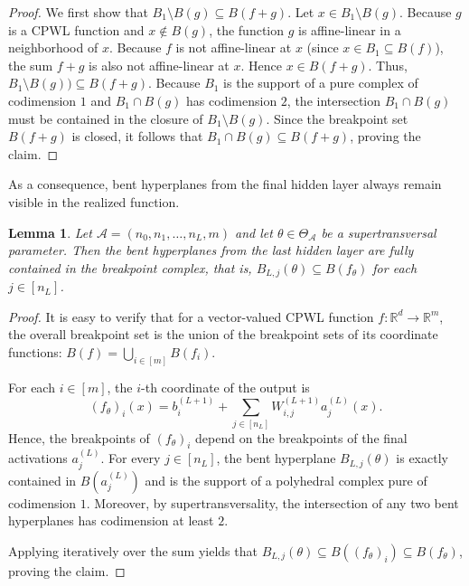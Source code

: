 \documentclass{article}
\newtheorem{lemma}[theorem]{Lemma}
\theoremstyle{definition}
\newcommand{\R}{\mathbb{R}}
\newcommand{\architecture}{\mathcal{A}}
\newcommand{\paramspace}[1]{\Theta_{#1}}
\newcommand{\weights}[1]{W^{(#1)}}
\newcommand{\bias}[1]{b^{(#1)}}
\newcommand{\activation}[1]{a^{(#1)}}
\newcommand{\breakpoints}[1]{B({#1})}
\begin{document}
\begin{proof}
We first show that
\(
B_1 \setminus \breakpoints{g} \subseteq \breakpoints{f+g}
\).
Let $x \in B_1 \setminus \breakpoints{g}$.
Because $g$ is a CPWL function and $x \notin \breakpoints{g}$, the function $g$ is affine-linear in a neighborhood of $x$.
Because $f$ is not affine-linear at $x$ (since $x \in B_1 \subseteq \breakpoints{f}$), the sum $f+g$ is also not affine-linear at $x$.
Hence $x \in \breakpoints{f+g}$.
Thus,
\(
B_1 \setminus  \breakpoints{g}) \subseteq \breakpoints{f+g}.
\)
Because $B_1$ is the support of a pure complex of codimension $1$ and $B_1 \cap \breakpoints{g}$ has codimension $2$, the intersection $B_1 \cap \breakpoints{g}$ must be contained in the closure of $B_1 \setminus \breakpoints{g}$. Since the breakpoint set $\breakpoints{f+g}$ is closed, it follows that $B_1 \cap \breakpoints{g} \subseteq \breakpoints{f+g}$, proving the claim.
\end{proof}
As a consequence, bent hyperplanes from the final hidden layer always remain visible in the realized function.
\begin{lemma}
\label{lem:lastbenthyperplanesstay}
Let $\architecture=(n_0,n_1,\ldots,n_L,m)$ and let $\theta \in \paramspace{\architecture}$ be a supertransversal parameter. 
Then the bent hyperplanes from the last hidden layer are fully contained in the breakpoint complex, that is, $B_{L,j}(\theta) \subseteq \breakpoints{f_\theta}$ for each $j \in [n_L]$. 
\end{lemma}
\begin{proof}
It is easy to verify that for a vector-valued CPWL function $f \colon \R^d \to \R^m$, the overall breakpoint set is the union of the breakpoint sets of its coordinate functions: $\breakpoints{f} = \bigcup_{i \in [m]}\breakpoints{f_i}$.

For each $i \in [m]$, the $i$-th coordinate of the output is 
\[
(f_\theta)_i(x) = \bias{L+1}_i + \sum_{j \in [n_L]} \weights{L+1}_{i,j} \activation{L}_j(x).
\]
Hence, the breakpoints of $(f_\theta)_i$ depend on the breakpoints of the final activations $\activation{L}_j$. For every $j \in [n_L]$, the bent hyperplane $B_{L,j}(\theta)$ is exactly contained in $\breakpoints{\activation{L}_j}$ and is the support of a polyhedral complex pure of codimension $1$. Moreover, by supertransversality, the intersection of any two bent hyperplanes has codimension at least $2$. 

Applying  iteratively over the sum yields that $B_{L,j}(\theta) \subseteq \breakpoints{(f_\theta)_i} \subseteq \breakpoints{f_\theta}$, proving the claim.
\end{proof}
\end{document}
